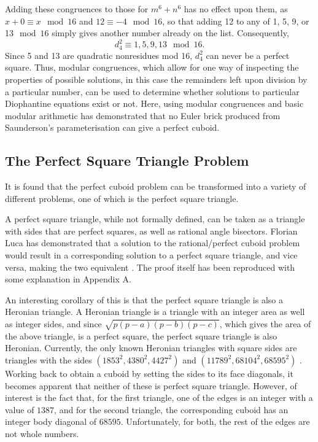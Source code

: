 \documentclass[11pt]{article}
\begin{document}
Adding these congruences to those for $m^6+n^6$ has no effect upon them, as $x+0\equiv{x}\mod{16}$ and $12\equiv{-4}\mod{16}$, so that adding 12 to any of 1, 5, 9, or 13$\mod{16}$ simply gives another number already on the list. Consequently, 
$$d_4^2\equiv{1, 5, 9, 13}\mod{16}.$$
Since 5 and 13 are quadratic nonresidues mod 16, $d_4^2$ can never be a perfect square. Thus, modular congruences, which allow for one way of inspecting the properties of possible solutions, in this case the remainders left upon division by a particular number, can be used to determine whether solutions to particular Diophantine equations exist or not. Here, using modular congruences and basic modular arithmetic has demonstrated that no Euler brick produced from Saunderson's parameterisation can give a perfect cuboid.

\subsection{The Perfect Square Triangle Problem}
It is found that the perfect cuboid problem can be transformed into a variety of different problems, one of which is the perfect square triangle.

A perfect square triangle, while not formally defined, can be taken as a triangle with sides that are perfect squares, as well as rational angle bisectors. Florian Luca has demonstrated that a solution to the rational/perfect cuboid problem would result in a corresponding solution to a perfect square triangle, and vice versa, making the two equivalent \cite{luca}. The proof itself has been reproduced with some explanation in Appendix A.

An interesting corollary of this is that the perfect square triangle is also a Heronian triangle. A Heronian triangle is a triangle with an integer area as well as integer sides, and since $\sqrt{p(p-a)(p-b)(p-c)}$, which gives the area of the above triangle, is a perfect square, the perfect square triangle is also Heronian. Currently, the only known Heronian triangles with square sides are triangles with the sides $(1853^2, 4380^2, 4427^2)$ and $(11789^2, 68104^2, 68595^2)$ \cite{sqh1}\cite{sqh2}. Working back to obtain a cuboid by setting the sides to its face diagonals, it becomes apparent that neither of these is perfect square triangle. However, of interest is the fact that, for the first triangle, one of the edges is an integer with a value of $1387$, and for the second triangle, the corresponding cuboid has an integer body diagonal of $68595$. Unfortunately, for both, the rest of the edges are not whole numbers. 
\end{document}

